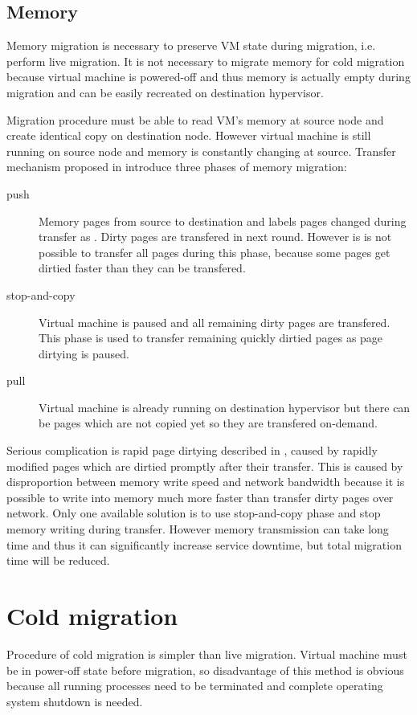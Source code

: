 \subsection{Memory}
Memory migration is necessary to preserve \Ac{VM} state during migration, i.e. perform live migration. It is not necessary to migrate memory for cold migration because virtual machine is powered-off and thus memory is actually empty during migration and can be easily recreated on destination hypervisor. 

Migration procedure must be able to read \Ac{VM}'s memory at source node and create identical copy on destination node. However virtual machine is still running on source node and memory is constantly changing at source. Transfer mechanism proposed in \cite{live-migration-of-vms} introduce three phases of memory migration:
\begin{description}
	\item[push] Memory pages from source to destination and labels pages changed during transfer as . Dirty pages are transfered in next round. However is is not possible to transfer all pages during this phase, because some pages get dirtied faster than they can be transfered.
	\item[stop-and-copy] Virtual machine is paused and all remaining dirty pages are transfered. This phase is used to transfer remaining quickly dirtied pages as page dirtying is paused.
	\item[pull] Virtual machine is already running on destination hypervisor but there can be pages which are not copied yet so they are transfered on-demand.
\end{description}

Serious complication is rapid page dirtying described in \cite{live-migration-of-vms}, caused by rapidly modified pages which are dirtied promptly after their transfer. This is caused by disproportion between memory write speed and network bandwidth because it is possible to write into memory much more faster than transfer dirty pages over network. Only one available solution is to use stop-and-copy phase and stop memory writing during transfer. However memory transmission can take long time and thus it can significantly increase service downtime, but total migration time will be reduced.

\section{Cold migration}
Procedure of cold migration is simpler than live migration. Virtual machine must be in power-off state before migration, so disadvantage of this method is obvious because all running processes need to be terminated and complete operating system shutdown is needed.

